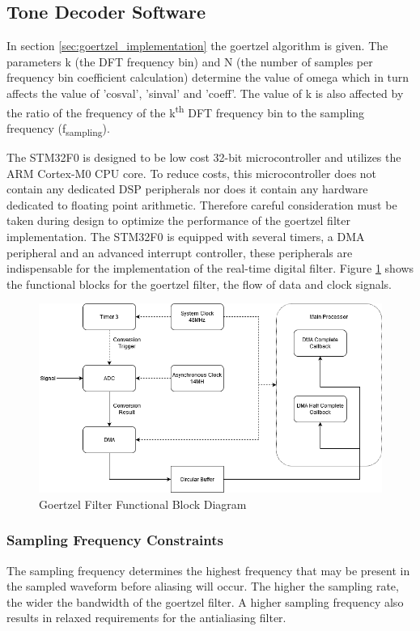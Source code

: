 \subsection{Tone Decoder Software}
\label{tone_decoder_software}

In section \ref{sec:goertzel_implementation} the goertzel algorithm is given. The parameters k (the DFT frequency bin) and N (the number of samples per frequency bin coefficient calculation) determine the value of omega which in turn affects the value of 'cosval', 'sinval' and 'coeff'. The value of k is also affected by the ratio of the frequency of the k\textsuperscript{th} DFT frequency bin to the sampling frequency (f\textsubscript{sampling}).

The STM32F0 is designed to be low cost 32-bit microcontroller and utilizes the ARM Cortex-M0 CPU core. To reduce costs, this microcontroller does not contain any dedicated DSP peripherals nor does it contain any hardware dedicated to floating point arithmetic. Therefore careful consideration must be taken during design to optimize the performance of the goertzel filter implementation. The STM32F0 is equipped with several timers, a DMA peripheral and an advanced interrupt controller, these peripherals are indispensable for the implementation of the real-time digital filter. Figure \ref{fig:goertzel_functional_diagram} shows the functional blocks for the goertzel filter, the flow of data and clock signals.

\begin{figure}[H]
	\centering
	\includegraphics[width=.8\textwidth]{figures/design/goertzel_filter_functional.png}
	\caption{Goertzel Filter Functional Block Diagram}
	\label{fig:goertzel_functional_diagram}
\end{figure}

\subsubsection{Sampling Frequency Constraints}
\label{sec:sampling_frequency_constraints}
The sampling frequency determines the highest frequency that may be present in the sampled waveform before aliasing will occur. The higher the sampling rate, the wider the bandwidth of the goertzel filter. A higher sampling frequency also results in relaxed requirements for the antialiasing filter.

